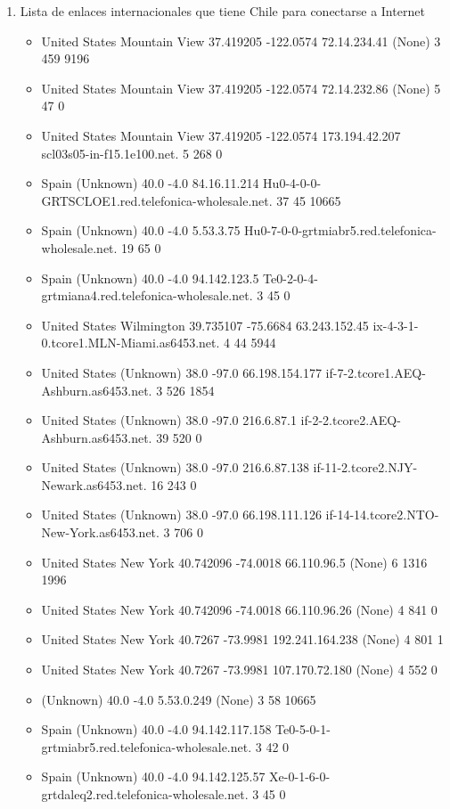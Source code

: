 \documentclass{article}
\begin{document}
\begin{enumerate}
\item Lista de enlaces internacionales que tiene Chile para conectarse a Internet\\
\begin{itemize}
\item United States	Mountain View	37.419205	-122.0574	72.14.234.41	(None)	3	459	9196
\item United States	Mountain View	37.419205	-122.0574	72.14.232.86	(None)	5	47	0
\item United States	Mountain View	37.419205	-122.0574	173.194.42.207	scl03s05-in-f15.1e100.net.	5	268	0
\item Spain	(Unknown)	40.0	-4.0	84.16.11.214	Hu0-4-0-0-GRTSCLOE1.red.telefonica-wholesale.net.	37	45	10665
\item Spain	(Unknown)	40.0	-4.0	5.53.3.75	Hu0-7-0-0-grtmiabr5.red.telefonica-wholesale.net.	19	65	0
\item Spain	(Unknown)	40.0	-4.0	94.142.123.5	Te0-2-0-4-grtmiana4.red.telefonica-wholesale.net.	3	45	0
\item United States	Wilmington	39.735107	-75.6684	63.243.152.45	ix-4-3-1-0.tcore1.MLN-Miami.as6453.net.	4	44	5944
\item United States	(Unknown)	38.0	-97.0	66.198.154.177	if-7-2.tcore1.AEQ-Ashburn.as6453.net.	3	526	1854
\item United States	(Unknown)	38.0	-97.0	216.6.87.1	if-2-2.tcore2.AEQ-Ashburn.as6453.net.	39	520	0
\item United States	(Unknown)	38.0	-97.0	216.6.87.138	if-11-2.tcore2.NJY-Newark.as6453.net.	16	243	0
\item United States	(Unknown)	38.0	-97.0	66.198.111.126	if-14-14.tcore2.NTO-New-York.as6453.net.	3	706	0
\item United States	New York	40.742096	-74.0018	66.110.96.5	(None)	6	1316	1996
\item United States	New York	40.742096	-74.0018	66.110.96.26	(None)	4	841	0
\item United States	New York	40.7267	-73.9981	192.241.164.238	(None)	4	801	1
\item United States	New York	40.7267	-73.9981	107.170.72.180	(None)	4	552	0
\item (Unknown)	40.0	-4.0	5.53.0.249	(None)	3	58	10665
\item Spain	(Unknown)	40.0	-4.0	94.142.117.158	Te0-5-0-1-grtmiabr5.red.telefonica-wholesale.net.	3	42	0
\item Spain	(Unknown)	40.0	-4.0	94.142.125.57	Xe-0-1-6-0-grtdaleq2.red.telefonica-wholesale.net.	3	45	0

\end{itemize}
\end{enumerate}
\end{document}
